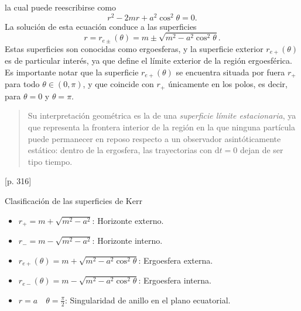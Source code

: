 la cual puede reescribirse como
\begin{equation}
    r^2-2mr+a^2\cos^2\theta =  0 .
\end{equation}
La solución de esta ecuación conduce a las superficies
\begin{equation}
    r=r_{e\pm}(\theta)=m\pm \sqrt{m^2-a^2\cos^2\theta}.
\end{equation}
Estas superficies son conocidas como ergoesferas, y la superficie exterior $r_{e+}(\theta)$ es de particular interés, ya que define el límite exterior de la región ergoesférica. Es importante notar que la superficie $r_{e+}(\theta)$ se encuentra situada por fuera $r_{+}$ para todo $\theta \in (0, \pi)$, y que coincide con $r_{+}$ únicamente en los polos, es decir, para $\theta=0$ y $\theta=\pi$.
\begin{quote}
    Su interpretación geométrica es la de una \textit{superficie límite estacionaria}, ya que representa la frontera interior de la región en la que ninguna partícula puede permanecer en reposo respecto a un observador asintóticamente estático: dentro de la ergosfera, las trayectorias con $\mathrm{d}t=0$ dejan de ser tipo tiempo.
\end{quote}\cite{chandrasekhar-1983}[p. 316]


\begin{definition}{Clasificación de las superficies de Kerr}{}
    \begin{itemize}
        \item $r_{+} = m + \sqrt{m^2-a^2}$: Horizonte externo.
        \item $r_{-} = m - \sqrt{m^2-a^2}$: Horizonte interno.
        \item $r_{e+}(\theta) = m+\sqrt{m^2-a^2\cos^2\theta}$: Ergoesfera externa.
        \item $r_{e-}(\theta) = m-\sqrt{m^2-a^2\cos^2\theta}$: Ergoesfera interna.
        \item $r = a \quad \theta = \frac{\pi}{2}$: Singularidad de anillo en el plano ecuatorial.
    \end{itemize}
\end{definition}

